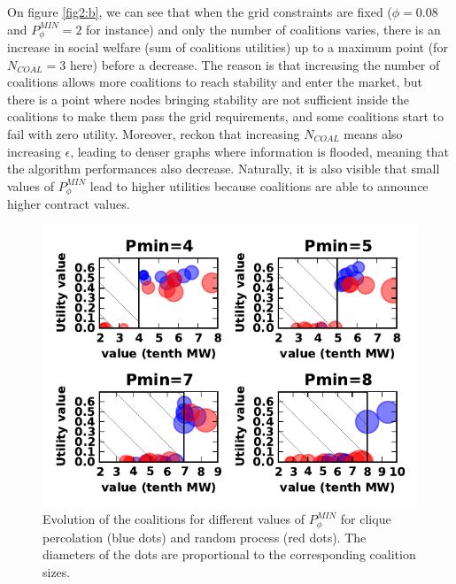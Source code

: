 \documentclass[conference]{IEEEtran}
\begin{document}
On figure \ref{fig2:b}, we can see that when the grid constraints are fixed ($ \phi = 0.08 $ and $ P_{\phi}^{MIN} = 2 $ for instance) and only the number of coalitions varies, there is an increase in social welfare (sum of coalitions utilities) up to a maximum point (for $ N_{COAL} = 3 $ here) before a decrease. The reason is that increasing the number of coalitions allows more coalitions to reach stability and enter the market, but there is a point where nodes bringing stability are not sufficient inside the coalitions to make them pass the grid requirements, and some coalitions start to fail with zero utility. Moreover, reckon that increasing $ N_{COAL} $ means also increasing $ \epsilon $, leading to denser graphs where information is flooded, meaning that the algorithm performances also decrease.
Naturally, it is also visible that small values of $P_{\phi}^{MIN}$ lead to higher utilities because coalitions are able to announce higher contract values.

\begin{center}
\begin{figure}[b]
  \includegraphics[scale=0.8]{./figure5/coals.pdf}
  \caption{Evolution of the coalitions for different values of $ P_{\phi}^{MIN} $ for clique percolation (blue dots) and random process (red dots). The diameters of the dots are proportional to the corresponding coalition sizes.}
  \label{Fig3}
\end{figure}
\end{center}
\end{document}
